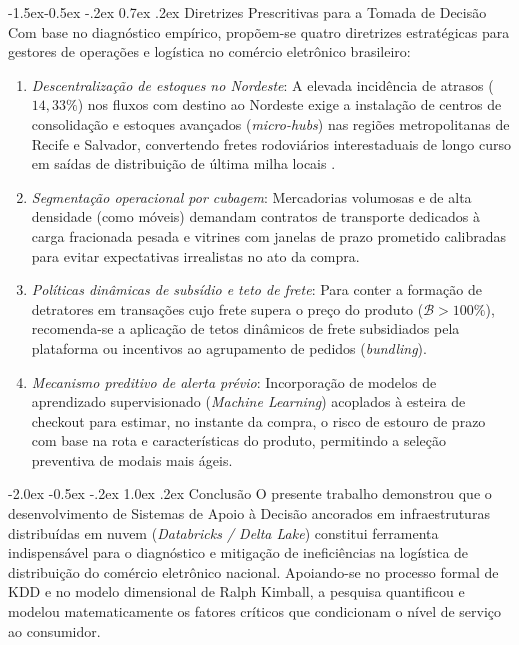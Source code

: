 \documentclass[10pt,a4paper,twocolumn]{article}
\makeatletter
\renewcommand\section{\@startsection {section}{1}{\z@}%
                                   {-2.0ex \@plus -0.5ex \@minus -.2ex}%
                                   {1.0ex \@plus .2ex}%
                                   {\normalfont\large\bfseries}}
\renewcommand\subsection{\@startsection{subsection}{2}{\z@}%
                                     {-1.5ex\@plus -0.5ex \@minus -.2ex}%
                                     {0.7ex \@plus .2ex}%
                                     {\normalfont\normalsize\bfseries}}
\makeatother
\begin{document}
\subsection{Diretrizes Prescritivas para a Tomada de Decisão}
Com base no diagnóstico empírico, propõem-se quatro diretrizes estratégicas para gestores de operações e logística no comércio eletrônico brasileiro:
\begin{enumerate}
    \item \textit{Descentralização de estoques no Nordeste}: A elevada incidência de atrasos ($14,33\%$) nos fluxos com destino ao Nordeste exige a instalação de centros de consolidação e estoques avançados (\textit{micro-hubs}) nas regiões metropolitanas de Recife e Salvador, convertendo fretes rodoviários interestaduais de longo curso em saídas de distribuição de última milha locais \citep{matos2025}.
    \item \textit{Segmentação operacional por cubagem}: Mercadorias volumosas e de alta densidade (como móveis) demandam contratos de transporte dedicados à carga fracionada pesada e vitrines com janelas de prazo prometido calibradas para evitar expectativas irrealistas no ato da compra.
    \item \textit{Políticas dinâmicas de subsídio e teto de frete}: Para conter a formação de detratores em transações cujo frete supera o preço do produto ($\mathcal{B} > 100\%$), recomenda-se a aplicação de tetos dinâmicos de frete subsidiados pela plataforma ou incentivos ao agrupamento de pedidos (\textit{bundling}).
    \item \textit{Mecanismo preditivo de alerta prévio}: Incorporação de modelos de aprendizado supervisionado (\textit{Machine Learning}) acoplados à esteira de checkout para estimar, no instante da compra, o risco de estouro de prazo com base na rota e características do produto, permitindo a seleção preventiva de modais mais ágeis.
\end{enumerate}

\section{Conclusão}
\label{sec:conclusao}
O presente trabalho demonstrou que o desenvolvimento de Sistemas de Apoio à Decisão ancorados em infraestruturas distribuídas em nuvem (\textit{Databricks / Delta Lake}) constitui ferramenta indispensável para o diagnóstico e mitigação de ineficiências na logística de distribuição do comércio eletrônico nacional. Apoiando-se no processo formal de KDD e no modelo dimensional de Ralph Kimball, a pesquisa quantificou e modelou matematicamente os fatores críticos que condicionam o nível de serviço ao consumidor.
\end{document}
